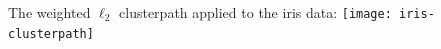 \documentclass[final]{beamer}
\begin{document}
\begin{frame}{}
\begin{columns}[T]
\begin{column}{0.315\linewidth}
The weighted $\ell_2$ clusterpath applied to the iris data:
\texttt{[image: iris-clusterpath]}
 


\end{column}
\end{columns}

\end{frame}
\end{document}
